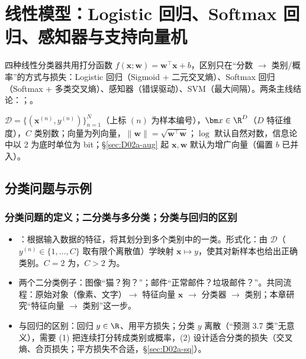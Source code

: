 \chapter{线性模型：Logistic 回归、Softmax 回归、感知器与支持向量机}
\noindent{}\quad 四种线性分类器共用打分函数 $f(\bm x;\bm w)=\bm w^\top\bm x+b$，区别只在“分数 $\to$ 类别/概率”的方式与损失：Logistic 回归（Sigmoid + 二元交叉熵）、Softmax 回归（Softmax + 多类交叉熵）、感知器（错误驱动）、SVM（最大间隔）。两条主线结论：；。

\noindent{}\quad $\mathcal D=\{(\bm x^{(n)},y^{(n)})\}_{n=1}^N$（上标 $(n)$ 为样本编号），$\bm x\in\R^D$（$D$ 特征维度），$C$ 类别数；向量为列向量，$\|\bm w\|=\sqrt{\bm w^\top\bm w}$；$\log$ 默认自然对数，信息论中以 2 为底时单位为 bit；§\ref{sec:D02a-aug} 起 $\bm x,\bm w$ 默认为增广向量（偏置 $b$ 已并入）。

\section{分类问题与示例}

\subsection{分类问题的定义；二分类与多分类；分类与回归的区别}
\begin{itemize}
\item {}：根据输入数据的特征，将其划分到多个类别中的一类。形式化：由 $\mathcal D$（$y^{(n)}\in\{1,\dots,C\}$ 取有限个离散值）学映射 $\bm x\mapsto y$，使其对新样本也给出正确类别。$C=2$ 为，$C>2$ 为。
\item 两个二分类例子：图像“猫？狗？”；邮件“正常邮件？垃圾邮件？”。共同流程：原始对象（像素、文字）$\to$ 特征向量 $\bm x$ $\to$ 分类器 $\to$ 类别；本章研究“特征向量 $\to$ 类别”这一步。
\item 与回归的区别：回归 $y\in\R$、用平方损失；分类 $y$ 离散（“预测 3.7 类”无意义），需要 (1) 把连续打分转成类别或概率，(2) 设计适合分类的损失（交叉熵、合页损失；平方损失不合适，§\ref{sec:D02a-sq}）。
\end{itemize}

